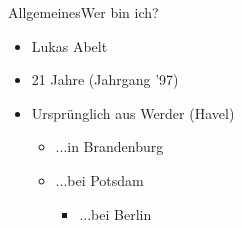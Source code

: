 \begin{frame}{Allgemeines}{Wer bin ich?}
	\begin{itemize}
		\item Lukas Abelt
		\item <2-> 21 Jahre (Jahrgang '97)
		\item <3-> Ursprünglich aus Werder (Havel)
		\begin{itemize}
			\item <4->...in Brandenburg
			\item <5->...bei Potsdam
			\begin{itemize}
				\item <6->...bei Berlin
			\end{itemize}
		\end{itemize}
	\end{itemize}
\end{frame}
	
